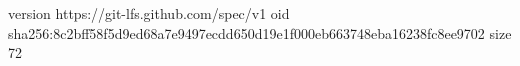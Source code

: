 version https://git-lfs.github.com/spec/v1
oid sha256:8c2bff58f5d9ed68a7e9497ecdd650d19e1f000eb663748eba16238fc8ee9702
size 72
